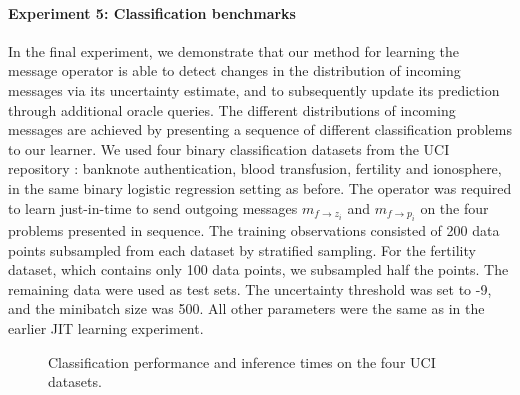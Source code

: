 \documentclass[english]{article}
\theoremstyle{plain}
\theoremstyle{plain}
\newcommand{\factor}{f}				%
\newcommand{\msg}[2]{m_{#1 \rightarrow #2}}			%
\newcommand{\secref}[1]{Section~\ref{#1}}
\begin{document}
\paragraph{Experiment 5: Classification benchmarks} In the final experiment, we demonstrate
that our method for learning the message operator is able to detect changes
in the distribution of incoming messages via its uncertainty estimate,
and to subsequently update its prediction through additional oracle queries.
The different distributions of incoming messages are achieved
by presenting a sequence of different classification problems to our learner.
We used four 
binary classification datasets from the UCI repository 
\citep{Lichm2013}: banknote authentication, blood transfusion, fertility 
and ionosphere, in the same binary logistic regression setting as 
before. The operator was required to learn just-in-time to send outgoing messages 
$\msg{\factor}{z_i}$ and $\msg{\factor}{p_i}$ on the four problems presented 
in sequence. The training observations consisted of 200 data points subsampled
from each dataset by stratified sampling. 
For the fertility dataset, which contains only 
100 data points, we subsampled half the points. The remaining  data were used as 
 test sets. The uncertainty threshold was set to -9, and the minibatch 
 size was 500. All other parameters were the same as in the earlier JIT learning experiment.

\begin{figure}[ht]
  \centering
  \caption{Classification performance and inference times on the four UCI datasets. 
   }
  \label{fig:uci_performance}
\end{figure}
\end{document}
